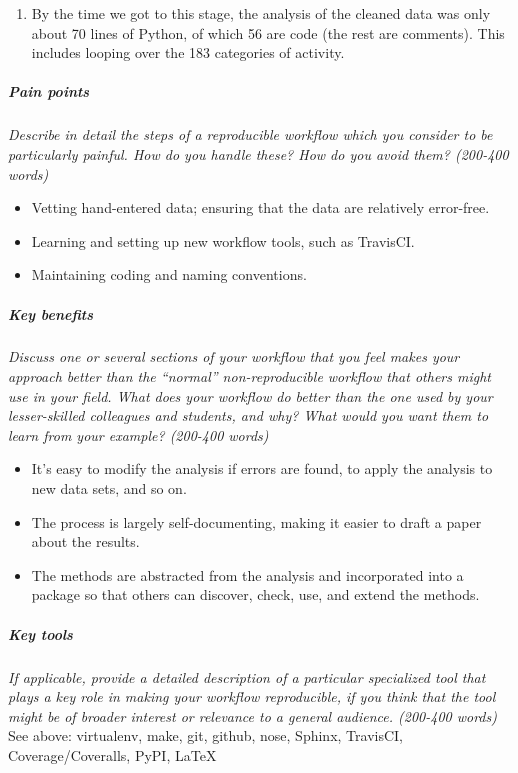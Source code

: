 \documentclass[]{article}
\begin{document}
\begin{enumerate}
  \begin{enumerate}
  \def\labelenumii{\roman{enumii}.}
  \itemsep1pt\parskip0pt
  \item
    By the time we got to this stage, the analysis of the cleaned data
    was only about 70 lines of Python, of which 56 are code (the rest
    are comments). This includes looping over the 183 categories of
    activity.
  \end{enumerate}
\end{enumerate}

\subparagraph{Pain points}\label{pain-points}

\emph{Describe in detail the steps of a reproducible workflow which you
consider to be particularly painful. How do you handle these? How do you
avoid them? (200-400 words)}

\begin{itemize}
\itemsep1pt\parskip0pt
\item
  Vetting hand-entered data; ensuring that the data are relatively
  error-free.
\item
  Learning and setting up new workflow tools, such as TravisCI.
\item
  Maintaining coding and naming conventions.
\end{itemize}

\subparagraph{Key benefits}\label{key-benefits}

\emph{Discuss one or several sections of your workflow that you feel
makes your approach better than the ``normal'' non-reproducible workflow
that others might use in your field. What does your workflow do better
than the one used by your lesser-skilled colleagues and students, and
why? What would you want them to learn from your example? (200-400
words)}

\begin{itemize}
\itemsep1pt\parskip0pt
\item
  It's easy to modify the analysis if errors are found, to apply the
  analysis to new data sets, and so on.
\item
  The process is largely self-documenting, making it easier to draft a
  paper about the results.
\item
  The methods are abstracted from the analysis and incorporated into a
  package so that others can discover, check, use, and extend the
  methods.
\end{itemize}

\subparagraph{Key tools}\label{key-tools}

\emph{If applicable, provide a detailed description of a particular
specialized tool that plays a key role in making your workflow
reproducible, if you think that the tool might be of broader interest or
relevance to a general audience. (200-400 words)} See above: virtualenv,
make, git, github, nose, Sphinx, TravisCI, Coverage/Coveralls, PyPI,
LaTeX



\end{document}
